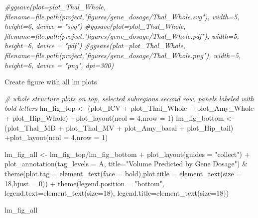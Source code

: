 \documentclass[
]{article}
\newenvironment{Shaded}{\begin{snugshade}}{\end{snugshade}}
\newcommand{\AttributeTok}[1]{\textcolor[rgb]{0.77,0.63,0.00}{#1}}
\newcommand{\CommentTok}[1]{\textcolor[rgb]{0.56,0.35,0.01}{\textit{#1}}}
\newcommand{\DecValTok}[1]{\textcolor[rgb]{0.00,0.00,0.81}{#1}}
\newcommand{\FunctionTok}[1]{\textcolor[rgb]{0.00,0.00,0.00}{#1}}
\newcommand{\NormalTok}[1]{#1}
\newcommand{\OtherTok}[1]{\textcolor[rgb]{0.56,0.35,0.01}{#1}}
\newcommand{\SpecialCharTok}[1]{\textcolor[rgb]{0.00,0.00,0.00}{#1}}
\newcommand{\StringTok}[1]{\textcolor[rgb]{0.31,0.60,0.02}{#1}}
\begin{document}
\begin{Shaded}
\begin{Highlighting}[]
\CommentTok{\#ggsave(plot=plot\_Thal\_Whole, filename=file.path(project,"figures/gene\_dosage/Thal\_Whole.svg"), width=5, height=6, device = "svg")}
\CommentTok{\#ggsave(plot=plot\_Thal\_Whole, filename=file.path(project,"figures/gene\_dosage/Thal\_Whole.pdf"), width=5, height=6, device = "pdf")}
\CommentTok{\#ggsave(plot=plot\_Thal\_Whole, filename=file.path(project,"figures/gene\_dosage/Thal\_Whole.png"), width=5, height=6, device = "png", dpi=300)}
\end{Highlighting}
\end{Shaded}

Create figure with all lm plots

\begin{Shaded}
\begin{Highlighting}[]
\CommentTok{\# whole structure plots on top, selected subregions second row, panels labeled with bold letters}
\NormalTok{lm\_fig\_top }\OtherTok{\textless{}{-}}\NormalTok{ (plot\_ICV }\SpecialCharTok{+}\NormalTok{ plot\_Thal\_Whole }\SpecialCharTok{+}\NormalTok{ plot\_Amy\_Whole }\SpecialCharTok{+}\NormalTok{ plot\_Hip\_Whole) }\SpecialCharTok{+}\FunctionTok{plot\_layout}\NormalTok{(}\AttributeTok{ncol =} \DecValTok{4}\NormalTok{,}\AttributeTok{nrow =} \DecValTok{1}\NormalTok{)}
\NormalTok{lm\_fig\_bottom }\OtherTok{\textless{}{-}}\NormalTok{ (plot\_Thal\_MD }\SpecialCharTok{+}\NormalTok{ plot\_Thal\_MV }\SpecialCharTok{+}\NormalTok{ plot\_Amy\_basal }\SpecialCharTok{+}\NormalTok{ plot\_Hip\_tail) }\SpecialCharTok{+}\FunctionTok{plot\_layout}\NormalTok{(}\AttributeTok{ncol =} \DecValTok{4}\NormalTok{,}\AttributeTok{nrow =} \DecValTok{1}\NormalTok{)}

\NormalTok{lm\_fig\_all }\OtherTok{\textless{}{-}}\NormalTok{ lm\_fig\_top}\SpecialCharTok{/}\NormalTok{lm\_fig\_bottom  }\SpecialCharTok{+} \FunctionTok{plot\_layout}\NormalTok{(}\AttributeTok{guides =} \StringTok{"collect"}\NormalTok{) }\SpecialCharTok{+} \FunctionTok{plot\_annotation}\NormalTok{(}\AttributeTok{tag\_levels =} \StringTok{\textquotesingle{}A\textquotesingle{}}\NormalTok{, }\AttributeTok{title=}\StringTok{"Volume Predicted by Gene Dosage"}\NormalTok{) }\SpecialCharTok{\&} \FunctionTok{theme}\NormalTok{(}\AttributeTok{plot.tag =} \FunctionTok{element\_text}\NormalTok{(}\AttributeTok{face =} \StringTok{\textquotesingle{}bold\textquotesingle{}}\NormalTok{),}\AttributeTok{plot.title =} \FunctionTok{element\_text}\NormalTok{(}\AttributeTok{size =} \DecValTok{18}\NormalTok{,}\AttributeTok{hjust =} \DecValTok{0}\NormalTok{)) }\SpecialCharTok{+} \FunctionTok{theme}\NormalTok{(}\AttributeTok{legend.position =} \StringTok{"bottom"}\NormalTok{, }\AttributeTok{legend.text=}\FunctionTok{element\_text}\NormalTok{(}\AttributeTok{size=}\DecValTok{18}\NormalTok{), }\AttributeTok{legend.title=}\FunctionTok{element\_text}\NormalTok{(}\AttributeTok{size=}\DecValTok{18}\NormalTok{))}

\NormalTok{lm\_fig\_all}
\end{Highlighting}
\end{Shaded}
\end{document}
